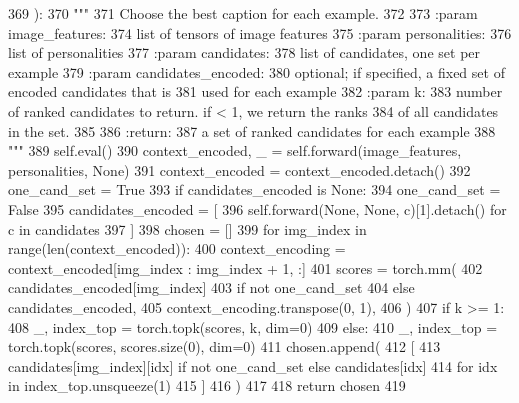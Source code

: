 \begin{DoxyCode}
369     ):
370         \textcolor{stringliteral}{"""}
371 \textcolor{stringliteral}{        Choose the best caption for each example.}
372 \textcolor{stringliteral}{}
373 \textcolor{stringliteral}{        :param image\_features:}
374 \textcolor{stringliteral}{            list of tensors of image features}
375 \textcolor{stringliteral}{        :param personalities:}
376 \textcolor{stringliteral}{            list of personalities}
377 \textcolor{stringliteral}{        :param candidates:}
378 \textcolor{stringliteral}{            list of candidates, one set per example}
379 \textcolor{stringliteral}{        :param candidates\_encoded:}
380 \textcolor{stringliteral}{            optional; if specified, a fixed set of encoded candidates that is}
381 \textcolor{stringliteral}{            used for each example}
382 \textcolor{stringliteral}{        :param k:}
383 \textcolor{stringliteral}{            number of ranked candidates to return. if < 1, we return the ranks}
384 \textcolor{stringliteral}{            of all candidates in the set.}
385 \textcolor{stringliteral}{}
386 \textcolor{stringliteral}{        :return:}
387 \textcolor{stringliteral}{            a set of ranked candidates for each example}
388 \textcolor{stringliteral}{        """}
389         self.eval()
390         context\_encoded, \_ = self.forward(image\_features, personalities, \textcolor{keywordtype}{None})
391         context\_encoded = context\_encoded.detach()
392         one\_cand\_set = \textcolor{keyword}{True}
393         \textcolor{keywordflow}{if} candidates\_encoded \textcolor{keywordflow}{is} \textcolor{keywordtype}{None}:
394             one\_cand\_set = \textcolor{keyword}{False}
395             candidates\_encoded = [
396                 self.forward(\textcolor{keywordtype}{None}, \textcolor{keywordtype}{None}, c)[1].detach() \textcolor{keywordflow}{for} c \textcolor{keywordflow}{in} candidates
397             ]
398         chosen = []
399         \textcolor{keywordflow}{for} img\_index \textcolor{keywordflow}{in} range(len(context\_encoded)):
400             context\_encoding = context\_encoded[img\_index : img\_index + 1, :]
401             scores = torch.mm(
402                 candidates\_encoded[img\_index]
403                 \textcolor{keywordflow}{if} \textcolor{keywordflow}{not} one\_cand\_set
404                 \textcolor{keywordflow}{else} candidates\_encoded,
405                 context\_encoding.transpose(0, 1),
406             )
407             \textcolor{keywordflow}{if} k >= 1:
408                 \_, index\_top = torch.topk(scores, k, dim=0)
409             \textcolor{keywordflow}{else}:
410                 \_, index\_top = torch.topk(scores, scores.size(0), dim=0)
411             chosen.append(
412                 [
413                     candidates[img\_index][idx] \textcolor{keywordflow}{if} \textcolor{keywordflow}{not} one\_cand\_set \textcolor{keywordflow}{else} candidates[idx]
414                     \textcolor{keywordflow}{for} idx \textcolor{keywordflow}{in} index\_top.unsqueeze(1)
415                 ]
416             )
417 
418         \textcolor{keywordflow}{return} chosen
419 
\end{DoxyCode}
